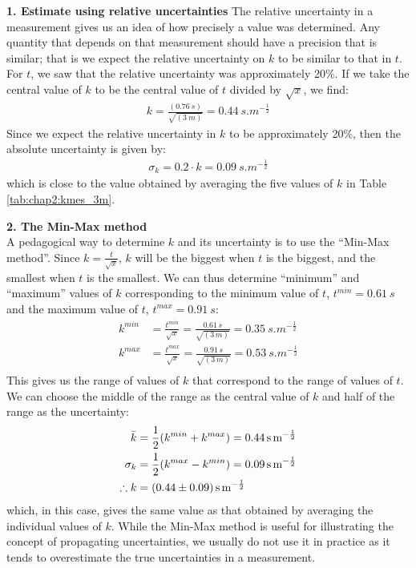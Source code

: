 \textbf{1. Estimate using relative uncertainties}
The relative uncertainty in a measurement gives us an idea of how precisely a value was determined. Any quantity that depends on that measurement should have a precision that is similar; that is we expect the relative uncertainty on $k$ to be similar to that in $t$. For $t$, we saw that the relative uncertainty was approximately 20\%. If we take the central value of $k$ to be the central value of $t$ divided by $\sqrt x$, we find:
\begin{align*}
k=\frac{(\SI{0.76}{s})}{\sqrt{(\SI{3}{m})}}=\SI{0.44}{s.m^{-\frac{1}{2}}}
\end{align*} 
Since we expect the relative uncertainty in $k$ to be approximately 20\%, then the absolute uncertainty is given by:
\begin{align*}
\sigma_k = 0.2\cdot k=\SI{0.09}{s.m^{-\frac{1}{2}}}
\end{align*}
which is close to the value obtained by averaging the five values of $k$ in Table \ref{tab:chap2:kmes_3m}.

\textbf{2. The Min-Max method}\\
A pedagogical way to determine $k$ and its uncertainty is to use the ``Min-Max method''. Since $k=\frac{t}{\sqrt x}$, $k$ will be the biggest when $t$ is the biggest, and the smallest when $t$ is the smallest. We can thus determine ``minimum'' and ``maximum'' values of $k$ corresponding to the minimum value of $t$, $t^{min}=\SI{0.61}{s}$ and the maximum value of $t$, $t^{max}=\SI{0.91}{s}$:
\begin{align*}
k^{min} &= \frac{t^{min}}{\sqrt x}=\frac{0.61\,s}{\sqrt{(3\,m)}} = \SI{0.35}{s.m^{-\frac{1}{2}}}\\
k^{max} &= \frac{t^{max}}{\sqrt x}=\frac{0.91\,s}{\sqrt{(3\,m)}} = \SI{0.53}{s.m^{-\frac{1}{2}}}\\
\end{align*}
This gives us the range of values of $k$ that correspond to the range of values of $t$. We can choose the middle of the range as the central value of $k$ and half of the range as the uncertainty:
\begin{align*}
\bar k &= \frac{1}{2}(k^{min}+k^{max})= \SI{0.44}{s.m^{-\frac{1}{2}}}\\
\sigma_k &= \frac{1}{2}(k^{max}-k^{min})= \SI{0.09}{s.m^{-\frac{1}{2}}}\\
\therefore k&= \SI{0.44 \pm 0.09}{s.m^{-\frac{1}{2}}}
\end{align*}
which, in this case, gives the same value as that obtained by averaging the individual values of $k$. While the Min-Max method is useful for illustrating the concept of propagating uncertainties, we usually do not use it in practice as it tends to overestimate the true uncertainties in a measurement. 

